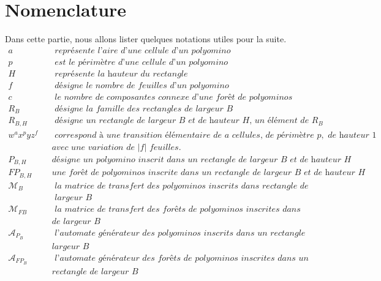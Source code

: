 \chapter*{Nomenclature}
Dans cette partie, nous allons lister quelques notations utiles pour la suite.
\begin{eqnarray*}
a & & \textit{ représente l'aire d'une cellule d'un polyomino}\\
p & & \textit{ est le périmètre d'une cellule d'un polyomino}\\
H & & \textit{ représente la hauteur du rectangle}\\
f & & \textit{ désigne le nombre de feuilles d'un polyomino}\\
c & & \textit{  le nombre de composantes connexe d'une forêt de polyominos}\\
R_{B} & & \textit{ désigne la famille des rectangles de largeur $B$}\\
R_{B,H} & & \textit{ désigne un rectangle de largeur $B$ et de hauteur $H$, un élément de $R_{B}$}\\
w^{a}x^{p}yz^{f} & &\textit{ correspond à une transition élémentaire de } a \textit{ cellules, }  \textit{de périmètre  }p, \textit{ de hauteur $1$ }\\ 
& & \textit{avec une variation de }  \vert f\vert  \textit{ feuilles}.\\
P_{B,H} & & \textit{désigne un polyomino inscrit dans un rectangle de largeur $B$ et de hauteur $H$} \\
FP_{B,H} & & \textit{une forêt de polyominos inscrite dans un rectangle de largeur } B \textit{ et de hauteur } H\\
\mathcal{M}_{B} & & \textit{ la matrice de transfert des polyominos inscrits dans  rectangle de}\\
& & \textit{ largeur } B\\
\mathcal{M}_{FB} & & \textit{ la matrice de transfert des forêts de polyominos inscrites dans  rectangle}\\
& & \textit{de largeur } B\\
\mathcal{A}_{P_{B}} & & \textit{ l'automate générateur des polyominos inscrits dans un rectangle de}\\
 & &  \textit{largeur } B\\
\mathcal{A}_{FP_{B}} & & \textit{ l'automate générateur des forêts de polyominos inscrites dans un}\\
& & \textit{rectangle de largeur } B
\end{eqnarray*}
\begin{tikzpicture}

\end{tikzpicture}
